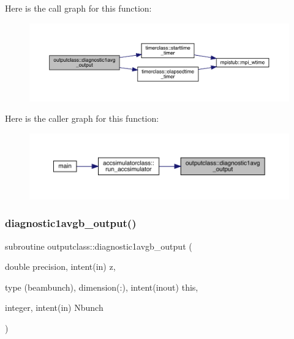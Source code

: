 Here is the call graph for this function\+:\nopagebreak
\begin{figure}[H]
\begin{center}
\leavevmode
\includegraphics[width=350pt]{namespaceoutputclass_ac91c3984014cb5cdc000c0422ccd08a1_cgraph}
\end{center}
\end{figure}
Here is the caller graph for this function\+:\nopagebreak
\begin{figure}[H]
\begin{center}
\leavevmode
\includegraphics[width=350pt]{namespaceoutputclass_ac91c3984014cb5cdc000c0422ccd08a1_icgraph}
\end{center}
\end{figure}
\mbox{\label{namespaceoutputclass_a42165712a4636aa78bacdd26efa4bae9}} 
\subsubsection{\texorpdfstring{diagnostic1avgb\_output()}{diagnostic1avgb\_output()}}
{\footnotesize\ttfamily subroutine outputclass\+::diagnostic1avgb\+\_\+output (\begin{DoxyParamCaption}\item[{double precision, intent(in)}]{z,  }\item[{type (beambunch), dimension(\+:), intent(inout)}]{this,  }\item[{integer, intent(in)}]{Nbunch }\end{DoxyParamCaption})}



